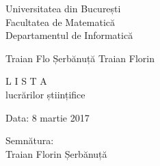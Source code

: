 \documentclass[12pt]{article}
\begin{document}
\medskip
\noindent Universitatea din București\\
Facultatea de Matematică\\
Departamentul de Informatică

\medskip
Traian Flo Șerbănuță Traian Florin

\medskip\begin{center}\Large L I S T A\\
\large lucrărilor științifice
\end{center}




\renewcommand*{\cvbibname}{}


  

    

    

\bigskip
\noindent
Data: 8 martie 2017\hfill \begin{minipage}{20em}\begin{center}Semnătura:\\Traian Florin Șerbănuță\end{center}\end{minipage}
\end{document}

